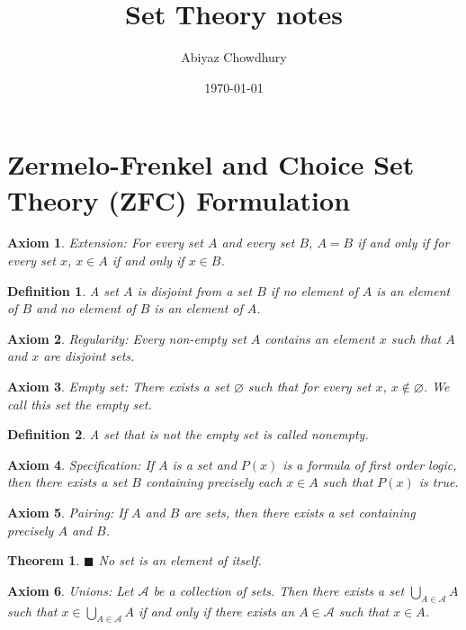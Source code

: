 \documentclass[a4paper]{article}
\title{\textbf{Set Theory notes}}
\author{Abiyaz Chowdhury}
\date{\today}
\newtheorem{mytheorem}{Theorem}
\newtheorem{axiom}{Axiom}
\newtheorem{mydef}{Definition}
\numberwithin{mytheorem}{section}
\numberwithin{mydef}{section}
\numberwithin{axiom}{section}
\numberwithin{example}{section}
\newcommand{\done}{$\blacksquare$ }
\begin{document}
\maketitle

\section{Zermelo-Frenkel and Choice Set Theory (ZFC) Formulation}

\begin{axiom} Extension: For every set $A$ and every set $B$, $A = B$ if and only if for every set $x$, $x \in A$ if and only if $x \in B$. 
\end{axiom}

\begin{mydef} A set $A$ is disjoint from a set $B$ if no element of $A$ is an element of $B$ and no element of $B$ is an element of $A$. 
\end{mydef}

\begin{axiom} Regularity: Every non-empty set $A$ contains an element $x$ such that $A$ and $x$ are disjoint sets.
\end{axiom}

\begin{axiom} Empty set: There exists a set $\varnothing$ such that for every set $x$, $x \notin \varnothing$. We call this set the empty set.
\end{axiom}

\begin{mydef} A set that is not the empty set is called nonempty.
\end{mydef}

\begin{axiom} Specification: If $A$ is a set and $P(x)$ is a formula of first order logic, then there exists a set $B$ containing precisely each $x \in A$ such that $P(x)$ is true. 
\end{axiom}

\begin{axiom} Pairing: If $A$ and $B$ are sets, then there exists a set containing precisely $A$ and $B$.
\end{axiom}

\begin{mytheorem} \done  No set is an element of itself. \end{mytheorem}

\begin{axiom} Unions: Let $\mathcal{A}$ be a collection of sets. Then there exists a set $\bigcup\limits_{A \in \mathcal{A}} A$ such that $x \in \bigcup\limits_{A \in \mathcal{A}} A$ if and only if there exists an $A \in \mathcal{A}$ such that $x \in A$.
\end{axiom}
\end{document}
